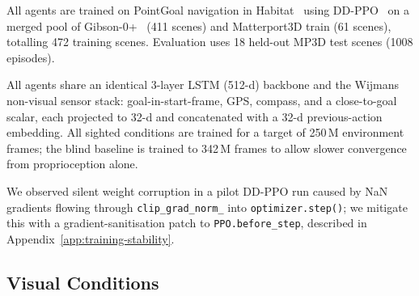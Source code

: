 \documentclass{article}
\begin{document}
All agents are trained on PointGoal navigation in Habitat~\citep{savva2019habitat} using DD-PPO~\citep{wijmans2020ddppo} on a merged pool of Gibson-0+~\citep{xia2018gibson} (411 scenes) and Matterport3D train (61 scenes), totalling 472 training scenes. Evaluation uses 18 held-out MP3D test scenes (1008 episodes).

All agents share an identical 3-layer LSTM (512-d) backbone and the Wijmans non-visual sensor stack: goal-in-start-frame, GPS, compass, and a close-to-goal scalar, each projected to 32-d and concatenated with a 32-d previous-action embedding. All sighted conditions are trained for a target of 250\,M environment frames; the blind baseline is trained to 342\,M frames to allow slower convergence from proprioception alone.

We observed silent weight corruption in a pilot DD-PPO run caused by NaN gradients flowing through \verb|clip_grad_norm_| into \verb|optimizer.step()|; we mitigate this with a gradient-sanitisation patch to \verb|PPO.before_step|, described in Appendix~\ref{app:training-stability}.

\subsection{Visual Conditions}
\label{sec:visual-conditions}
\end{document}
